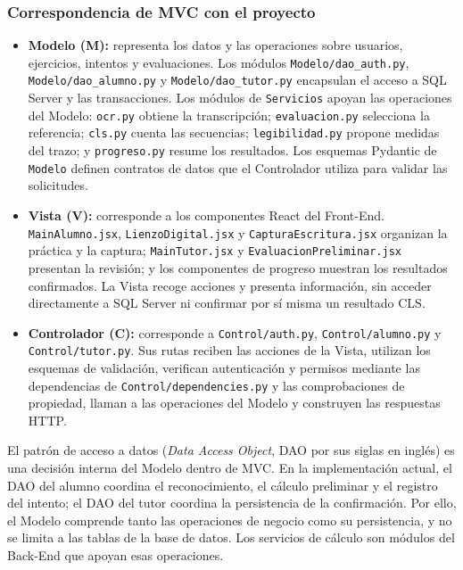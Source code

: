 \subsubsection{Correspondencia de MVC con el proyecto}
\begin{itemize}
    \item \textbf{Modelo (M):} representa los datos y las operaciones sobre usuarios, ejercicios, intentos y evaluaciones. Los módulos \texttt{Modelo/dao\_auth.py}, \texttt{Modelo/dao\_alumno.py} y \texttt{Modelo/dao\_tutor.py} encapsulan el acceso a SQL Server y las transacciones. Los módulos de \texttt{Servicios} apoyan las operaciones del Modelo: \texttt{ocr.py} obtiene la transcripción; \texttt{evaluacion.py} selecciona la referencia; \texttt{cls.py} cuenta las secuencias; \texttt{legibilidad.py} propone medidas del trazo; y \texttt{progreso.py} resume los resultados. Los esquemas Pydantic de \texttt{Modelo} definen contratos de datos que el Controlador utiliza para validar las solicitudes.
    \item \textbf{Vista (V):} corresponde a los componentes React del Front-End. \texttt{MainAlumno.jsx}, \texttt{LienzoDigital.jsx} y \texttt{CapturaEscritura.jsx} organizan la práctica y la captura; \texttt{MainTutor.jsx} y \texttt{EvaluacionPreliminar.jsx} presentan la revisión; y los componentes de progreso muestran los resultados confirmados. La Vista recoge acciones y presenta información, sin acceder directamente a SQL Server ni confirmar por sí misma un resultado CLS.
    \item \textbf{Controlador (C):} corresponde a \texttt{Control/auth.py}, \texttt{Control/alumno.py} y \texttt{Control/tutor.py}. Sus rutas reciben las acciones de la Vista, utilizan los esquemas de validación, verifican autenticación y permisos mediante las dependencias de \texttt{Control/dependencies.py} y las comprobaciones de propiedad, llaman a las operaciones del Modelo y construyen las respuestas HTTP.
\end{itemize}

El patrón de acceso a datos (\textit{Data Access Object}, DAO por sus siglas en inglés) es una decisión interna del Modelo dentro de MVC. En la implementación actual, el DAO del alumno coordina el reconocimiento, el cálculo preliminar y el registro del intento; el DAO del tutor coordina la persistencia de la confirmación. Por ello, el Modelo comprende tanto las operaciones de negocio como su persistencia, y no se limita a las tablas de la base de datos. Los servicios de cálculo son módulos del Back-End que apoyan esas operaciones.

